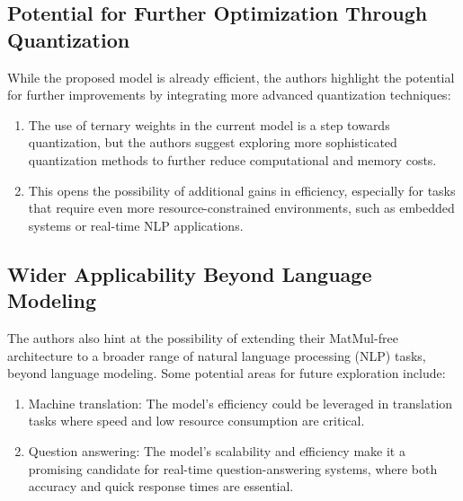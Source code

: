 \documentclass{report}
\begin{document}
	
	\subsection{Potential for Further Optimization Through Quantization}
	While the proposed model is already efficient, the authors highlight the potential for further improvements by integrating more advanced quantization techniques:
	
	\begin{enumerate}
		\item 
		The use of ternary weights in the current model is a step towards quantization, but the authors suggest exploring more sophisticated quantization methods to further reduce computational and memory costs.
		
		\item 
		This opens the possibility of additional gains in efficiency, especially for tasks that require even more resource-constrained environments, such as embedded systems or real-time NLP applications.
	\end{enumerate}
	
	
	\subsection{Wider Applicability Beyond Language Modeling}
	The authors also hint at the possibility of extending their MatMul-free architecture to a broader range of natural language processing (NLP) tasks, beyond language modeling. Some potential areas for future exploration include:
	\begin{enumerate}
		\item 
		 Machine translation: The model’s efficiency could be leveraged in translation tasks where speed and low resource consumption are critical.
		
		\item 
		Question answering: The model’s scalability and efficiency make it a promising candidate for real-time question-answering systems, where both accuracy and quick response times are essential.
	\end{enumerate}
	
	
\end{document}
